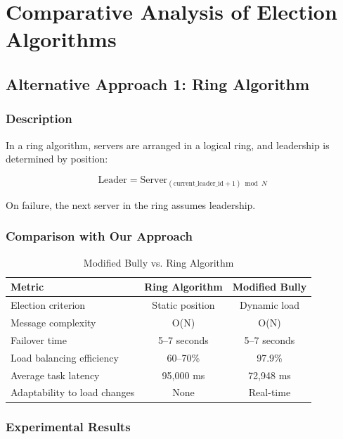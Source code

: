\documentclass[12pt,a4paper]{article}
\begin{document}
\newpage

\section{Comparative Analysis of Election Algorithms}
\label{sec:comparison}

\subsection{Alternative Approach 1: Ring Algorithm}

\subsubsection{Description}

In a ring algorithm, servers are arranged in a logical ring, and leadership is determined by position:

\begin{equation}
\text{Leader} = \text{Server}_{(\text{current\_leader\_id} + 1) \bmod N}
\end{equation}

On failure, the next server in the ring assumes leadership.

\subsubsection{Comparison with Our Approach}

\begin{table}[h]
\centering
\caption{Modified Bully vs. Ring Algorithm}
\label{tab:bully-vs-ring}
\begin{tabular}{@{}lcc@{}}
\toprule
\textbf{Metric} & \textbf{Ring Algorithm} & \textbf{Modified Bully} \\
\midrule
Election criterion & Static position & Dynamic load \\
Message complexity & O(N) & O(N) \\
Failover time & 5--7 seconds & 5--7 seconds \\
Load balancing efficiency & 60--70\% & 97.9\% \\
Average task latency & 95,000 ms & 72,948 ms \\
Adaptability to load changes & None & Real-time \\
\bottomrule
\end{tabular}
\end{table}

\subsubsection{Experimental Results}
\end{document}

